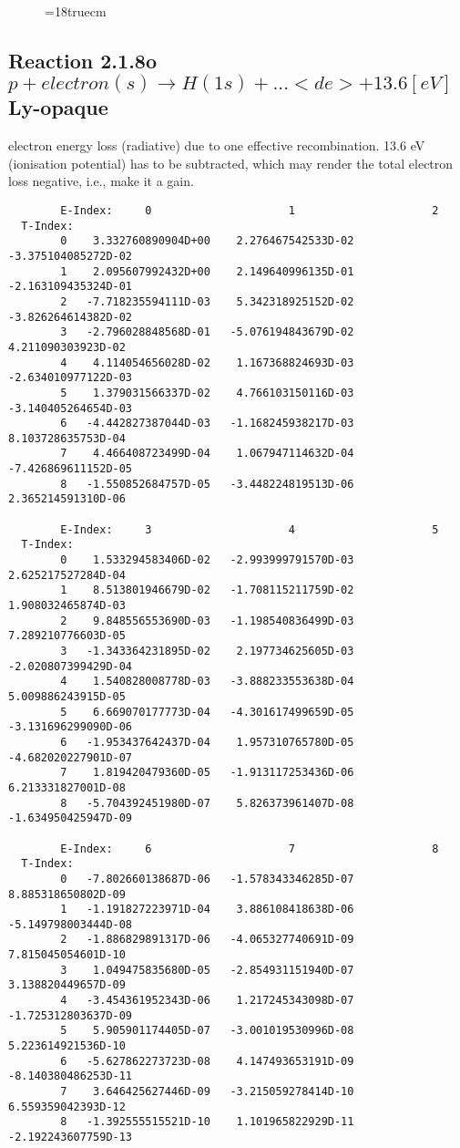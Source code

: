 \begin{figure} \label{2.1.8lr2}
\epsfxsize=18truecm
\end{figure}
\newpage



\subsection{
  Reaction 2.1.8o $p + electron(s) \rightarrow H(1s) + ... <de>+13.6 [eV] $ Ly-opaque
}

  electron energy loss (radiative) due to one effective recombination.
  13.6 eV (ionisation potential) has to be
  subtracted, which may render the total electron loss negative, i.e., make it a gain.

\begin{verbatim}
        E-Index:     0                     1                     2
  T-Index:
        0    3.332760890904D+00    2.276467542533D-02   -3.375104085272D-02
        1    2.095607992432D+00    2.149640996135D-01   -2.163109435324D-01
        2   -7.718235594111D-03    5.342318925152D-02   -3.826264614382D-02
        3   -2.796028848568D-01   -5.076194843679D-02    4.211090303923D-02
        4    4.114054656028D-02    1.167368824693D-03   -2.634010977122D-03
        5    1.379031566337D-02    4.766103150116D-03   -3.140405264654D-03
        6   -4.442827387044D-03   -1.168245938217D-03    8.103728635753D-04
        7    4.466408723499D-04    1.067947114632D-04   -7.426869611152D-05
        8   -1.550852684757D-05   -3.448224819513D-06    2.365214591310D-06

        E-Index:     3                     4                     5
  T-Index:
        0    1.533294583406D-02   -2.993999791570D-03    2.625217527284D-04
        1    8.513801946679D-02   -1.708115211759D-02    1.908032465874D-03
        2    9.848556553690D-03   -1.198540836499D-03    7.289210776603D-05
        3   -1.343364231895D-02    2.197734625605D-03   -2.020807399429D-04
        4    1.540828008778D-03   -3.888233553638D-04    5.009886243915D-05
        5    6.669070177773D-04   -4.301617499659D-05   -3.131696299090D-06
        6   -1.953437642437D-04    1.957310765780D-05   -4.682020227901D-07
        7    1.819420479360D-05   -1.913117253436D-06    6.213331827001D-08
        8   -5.704392451980D-07    5.826373961407D-08   -1.634950425947D-09

        E-Index:     6                     7                     8
  T-Index:
        0   -7.802660138687D-06   -1.578343346285D-07    8.885318650802D-09
        1   -1.191827223971D-04    3.886108418638D-06   -5.149798003444D-08
        2   -1.886829891317D-06   -4.065327740691D-09    7.815045054601D-10
        3    1.049475835680D-05   -2.854931151940D-07    3.138820449657D-09
        4   -3.454361952343D-06    1.217245343098D-07   -1.725312803637D-09
        5    5.905901174405D-07   -3.001019530996D-08    5.223614921536D-10
        6   -5.627862273723D-08    4.147493653191D-09   -8.140380486253D-11
        7    3.646425627446D-09   -3.215059278414D-10    6.559359042393D-12
        8   -1.392555515521D-10    1.101965822929D-11   -2.192243607759D-13


\end{verbatim}
